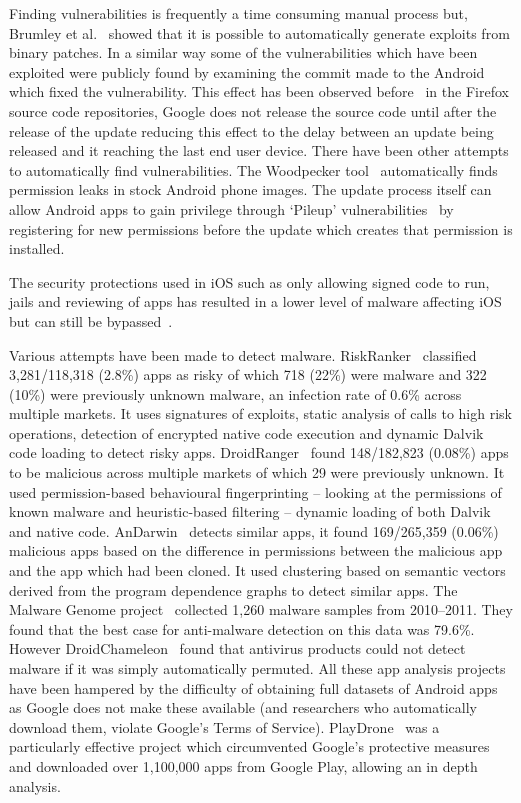 \documentclass[conference,a4paper,twoside]{IEEEtran}
\let\OldTodo\todo
\renewcommand{\todo}{\OldTodo[inline]}
\newcommand{\todolater}[1]{}%
\begin{document}
Finding vulnerabilities is frequently a time consuming manual process but, Brumley et al.~\cite{Brumley2008} showed that it is possible to automatically generate exploits from binary patches.
In a similar way some of the vulnerabilities\todolater{which?} which have been exploited were publicly found by examining the commit made to the Android which fixed the vulnerability.
This effect has been observed before~\cite{Barth2011} in the Firefox source code repositories, Google does not release the source code until after the release of the update reducing this effect to the delay between an update being released and it reaching the last end user device.
There have been other attempts to automatically find vulnerabilities.
The Woodpecker tool~\cite{Grace2012} automatically finds permission leaks in stock Android phone images.
The update process itself can allow Android apps to gain privilege through `Pileup' vulnerabilities~\cite{Xing2014} by registering for new permissions before the update which creates that permission is installed.

The security protections used in iOS such as only allowing signed code to run, jails and reviewing of apps has resulted in a lower level of malware affecting iOS~\cite{TODO} but can still be bypassed~\cite{Wang2013a}. \todo{look at iOS protections again and tighten this up}

Various attempts have been made to detect malware.
RiskRanker~\cite{Grace2012a} classified 3,281/118,318 (2.8\%) apps as risky of which 718 (22\%) were malware and 322 (10\%) were previously unknown malware, an infection rate of 0.6\% across multiple markets.
It uses signatures of exploits, static analysis of calls to high risk operations, detection of encrypted native code execution and dynamic Dalvik code loading to detect risky apps.
DroidRanger~\cite{Zhou2012a} found 148/182,823 (0.08\%) apps to be malicious across multiple markets of which 29 were previously unknown.
It used permission-based behavioural fingerprinting -- looking at the permissions of known malware and heuristic-based filtering -- dynamic loading of both Dalvik and native code.
AnDarwin~\cite{Crussell2013} detects similar apps, it found 169/265,359 (0.06\%) malicious apps based on the difference in permissions between the malicious app and the app which had been cloned.
It used clustering based on semantic vectors derived from the program dependence graphs to detect similar apps.
The Malware Genome project~\cite{Zhou2012b} collected 1,260 malware samples from 2010--2011.
They found that the best case for anti-malware detection on this data was 79.6\%.
However DroidChameleon~\cite{Rastogi2013} found that antivirus products could not detect malware if it was simply automatically permuted.
All these app analysis projects have been hampered by the difficulty of obtaining full datasets of Android apps as Google does not make these available (and researchers who automatically download them, violate Google's Terms of Service).
PlayDrone~\cite{Viennot2014} was a particularly effective project which circumvented Google's protective measures and downloaded over 1,100,000 apps from Google Play, allowing an in depth analysis.
\end{document}
